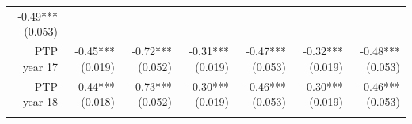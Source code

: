 \documentclass[]{article}
\begin{document}
\begin{longtable}[c]{@{}rrrrrrr@{}}
\begin{minipage}[t]{0.11\columnwidth}
-0.49*** (0.053)
\strut\end{minipage}\tabularnewline
\begin{minipage}[t]{0.12\columnwidth}\raggedleft\strut
PTP year 17
\strut\end{minipage} &
\begin{minipage}[t]{0.11\columnwidth}\raggedleft\strut
-0.45*** (0.019)
\strut\end{minipage} &
\begin{minipage}[t]{0.12\columnwidth}\raggedleft\strut
-0.72*** (0.052)
\strut\end{minipage} &
\begin{minipage}[t]{0.11\columnwidth}\raggedleft\strut
-0.31*** (0.019)
\strut\end{minipage} &
\begin{minipage}[t]{0.12\columnwidth}\raggedleft\strut
-0.47*** (0.053)
\strut\end{minipage} &
\begin{minipage}[t]{0.11\columnwidth}\raggedleft\strut
-0.32*** (0.019)
\strut\end{minipage} &
\begin{minipage}[t]{0.11\columnwidth}\raggedleft\strut
-0.48*** (0.053)
\strut\end{minipage}\tabularnewline
\begin{minipage}[t]{0.12\columnwidth}\raggedleft\strut
PTP year 18
\strut\end{minipage} &
\begin{minipage}[t]{0.11\columnwidth}\raggedleft\strut
-0.44*** (0.018)
\strut\end{minipage} &
\begin{minipage}[t]{0.12\columnwidth}\raggedleft\strut
-0.73*** (0.052)
\strut\end{minipage} &
\begin{minipage}[t]{0.11\columnwidth}\raggedleft\strut
-0.30*** (0.019)
\strut\end{minipage} &
\begin{minipage}[t]{0.12\columnwidth}\raggedleft\strut
-0.46*** (0.053)
\strut\end{minipage} &
\begin{minipage}[t]{0.11\columnwidth}\raggedleft\strut
-0.30*** (0.019)
\strut\end{minipage} &
\begin{minipage}[t]{0.11\columnwidth}\raggedleft\strut
-0.46*** (0.053)
\strut\end{minipage}\tabularnewline
\begin{minipage}[t]{0.12\columnwidth}\raggedleft\strut

\end{minipage}
\end{longtable}
\end{document}

